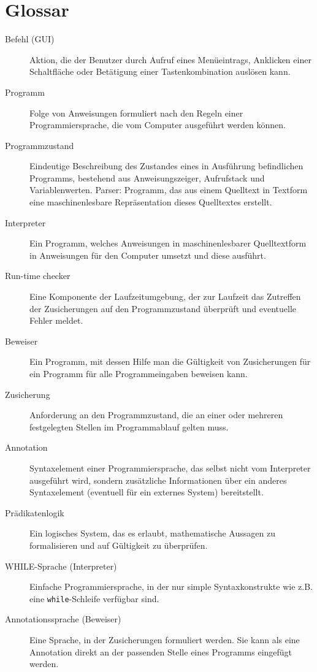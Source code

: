 \section{Glossar}
\begin{description}
    \item[Befehl (GUI)] Aktion, die der Benutzer durch Aufruf eines Menüeintrags, Anklicken einer Schaltfläche oder Betätigung einer Tastenkombination auslösen kann.
    \item[Programm] Folge von Anweisungen formuliert nach den Regeln einer Programmiersprache, die vom Computer ausgeführt werden können.
    \item[Programmzustand] Eindeutige Beschreibung des Zustandes eines in Ausführung befindlichen Programms, bestehend aus Anweisungszeiger, Aufrufstack und Variablenwerten.
    Parser: Programm, das aus einem Quelltext in Textform eine maschinenlesbare Repräsentation dieses Quelltextes erstellt.
    \item[Interpreter] Ein Programm, welches Anweisungen in maschinenlesbarer Quelltextform in Anweisungen für den Computer umsetzt und diese ausführt.
    \item[Run-time checker] Eine Komponente der Laufzeitumgebung, der zur Laufzeit das Zutreffen der Zusicherungen auf den Programmzustand überprüft und eventuelle Fehler meldet.
    \item[Beweiser] Ein Programm, mit dessen Hilfe man die Gültigkeit von Zusicherungen für ein Programm für alle Programmeingaben beweisen kann.
    \item[Zusicherung] Anforderung an den Programmzustand, die an einer oder mehreren festgelegten Stellen im Programmablauf gelten muss.
    \item[Annotation] Syntaxelement einer Programmiersprache, das selbst nicht vom Interpreter ausgeführt wird, sondern zusätzliche Informationen über ein anderes Syntaxelement (eventuell für ein externes System) bereitstellt.
    \item[Prädikatenlogik] Ein logisches System, das es erlaubt, mathematische Aussagen zu formalisieren und auf Gültigkeit zu überprüfen. %
    \item[WHILE-Sprache (Interpreter)] Einfache Programmiersprache, in der nur simple Syntaxkonstrukte wie z.B. eine \texttt{while}-Schleife verfügbar sind.
    \item[Annotationssprache (Beweiser)] Eine Sprache, in der \see Zusicherungen formuliert werden. Sie kann als eine Annotation direkt an der passenden Stelle eines Programms eingefügt werden.

\end{description}

